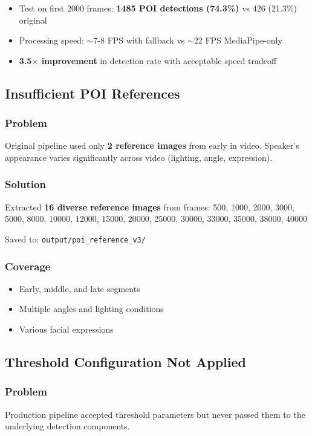 \documentclass[11pt,a4paper]{article}
\begin{document}
\begin{itemize}
    \item Test on first 2000 frames: \textbf{1485 POI detections (74.3\%)} vs 426 (21.3\%) original
    \item Processing speed: $\sim$7-8 FPS with fallback vs $\sim$22 FPS MediaPipe-only
    \item \textbf{3.5$\times$ improvement} in detection rate with acceptable speed tradeoff
\end{itemize}

\subsection{Insufficient POI References}

\subsubsection{Problem}
Original pipeline used only \textbf{2 reference images} from early in video. Speaker's appearance varies significantly across video (lighting, angle, expression).

\subsubsection{Solution}
Extracted \textbf{16 diverse reference images} from frames:
500, 1000, 2000, 3000, 5000, 8000, 10000, 12000, 15000, 20000, 25000, 30000, 33000, 35000, 38000, 40000

Saved to: \texttt{output/poi\_reference\_v3/}

\subsubsection{Coverage}
\begin{itemize}
    \item Early, middle, and late segments
    \item Multiple angles and lighting conditions
    \item Various facial expressions
\end{itemize}

\subsection{Threshold Configuration Not Applied}

\subsubsection{Problem}
Production pipeline accepted threshold parameters but never passed them to the underlying detection components.
\end{document}
